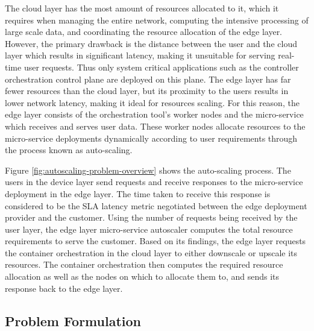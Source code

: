 The cloud layer has the most amount of resources allocated to it, which it requires when managing the entire network, computing the intensive processing of large scale data, and coordinating the resource allocation of the edge layer. However, the primary drawback is the distance between the user and the cloud layer which results in significant latency, making it unsuitable for serving real-time user requests. Thus only system critical applications such as the controller orchestration control plane are deployed on this plane. The edge layer has far fewer resources than the cloud layer, but its proximity to the users results in lower network latency, making it ideal for resources scaling. For this reason, the edge layer consists of the orchestration tool's worker nodes and the micro-service which receives and serves user data. These worker nodes allocate resources to the micro-service deployments dynamically according to user requirements through the process known as auto-scaling.\par

Figure \ref{fig:autoscaling-problem-overview} shows the auto-scaling process. The users in the device layer send requests and receive responses to the micro-service deployment in the edge layer. The time taken to receive this response is considered to be the SLA latency metric negotiated between the edge deployment provider and the customer. Using the number of requests being received by the user layer, the edge layer micro-service autoscaler computes the total resource requirements to serve the customer. Based on its findings, the edge layer requests the container orchestration in the cloud layer to either downscale or upscale its resources. The container orchestration then computes the required resource allocation as well as the nodes on which to allocate them to, and sends its response back to the edge layer.\par

\subsection{Problem Formulation}
\label{subsec:ch3-problem-formulation}

